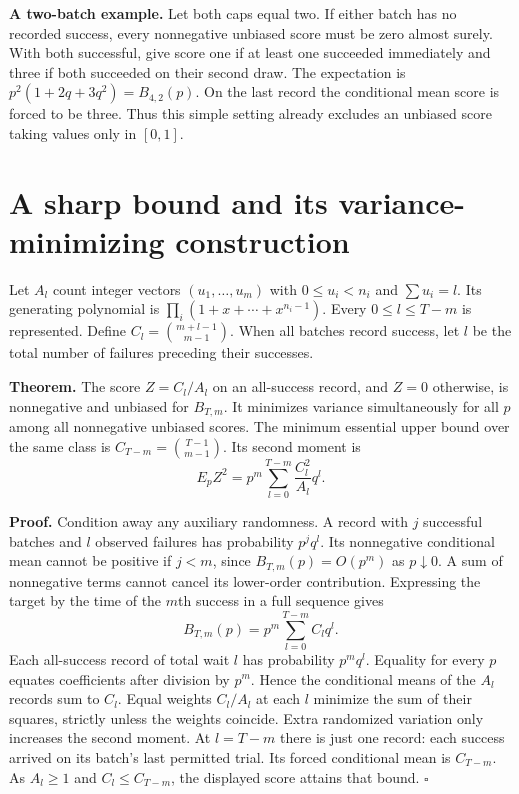 \documentclass[11pt]{article}
\begin{document}
\textbf{A two-batch example.} Let both caps equal two. If either batch has no recorded success, every nonnegative unbiased score must be zero almost surely. With both successful, give score one if at least one succeeded immediately and three if both succeeded on their second draw. The expectation is $p^2(1+2q+3q^2)=B_{4,2}(p)$. On the last record the conditional mean score is forced to be three. Thus this simple setting already excludes an unbiased score taking values only in $[0,1]$.

\newpage
\section*{A sharp bound and its variance-minimizing construction}
Let $A_l$ count integer vectors $(u_1,\ldots,u_m)$ with $0\le u_i<n_i$ and $\sum u_i=l$. Its generating polynomial is $\prod_i(1+x+\cdots+x^{n_i-1})$. Every $0\le l\le T-m$ is represented. Define $C_l=\binom{m+l-1}{m-1}$. When all batches record success, let $l$ be the total number of failures preceding their successes.

\textbf{Theorem.} The score $Z=C_l/A_l$ on an all-success record, and $Z=0$ otherwise, is nonnegative and unbiased for $B_{T,m}$. It minimizes variance simultaneously for all $p$ among all nonnegative unbiased scores. The minimum essential upper bound over the same class is $C_{T-m}=\binom{T-1}{m-1}$. Its second moment is
\[
 E_p Z^2=p^m\sum_{l=0}^{T-m}\frac{C_l^2}{A_l}q^l .
\]

\textbf{Proof.} Condition away any auxiliary randomness. A record with $j$ successful batches and $l$ observed failures has probability $p^j q^l$. Its nonnegative conditional mean cannot be positive if $j<m$, since $B_{T,m}(p)=O(p^m)$ as $p\downarrow0$. A sum of nonnegative terms cannot cancel its lower-order contribution. Expressing the target by the time of the $m$th success in a full sequence gives
\[
 B_{T,m}(p)=p^m\sum_{l=0}^{T-m} C_l q^l.
\]
Each all-success record of total wait $l$ has probability $p^m q^l$. Equality for every $p$ equates coefficients after division by $p^m$. Hence the conditional means of the $A_l$ records sum to $C_l$. Equal weights $C_l/A_l$ at each $l$ minimize the sum of their squares, strictly unless the weights coincide. Extra randomized variation only increases the second moment. At $l=T-m$ there is just one record: each success arrived on its batch's last permitted trial. Its forced conditional mean is $C_{T-m}$. As $A_l\ge1$ and $C_l\le C_{T-m}$, the displayed score attains that bound. \hfill$\square$
\end{document}
